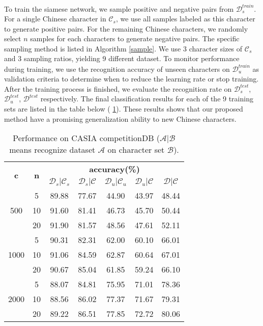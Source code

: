 \documentclass[conference]{IEEEtran}
\begin{document}
To train the siamese network, we sample positive and negative pairs from  $\mathcal{D}_s^{train}$. For a single Chinese character in $\mathcal{C}_s$, we use all samples labeled as this character to generate positive pairs. For the remaining Chinese characters, we randomly select $n$ samples for each characters to generate negative pairs. The specific sampling method is listed in Algorithm \ref{sample}. 
We use 3 character sizes of $\mathcal{C}_s$ and 3 sampling ratios, yielding 9 different dataset. To monitor performance during training, we use the recognition accuracy of unseen characters on $\mathcal{D}_u^{train}$ as validation criteria to determine when to reduce the learning rate or stop training. After the training process is finished, we evaluate the recognition rate on  $\mathcal{D}_s^{test}$, $\mathcal{D}_u^{test}$, $\mathcal{D}^{test}$ respectively.
The final classification results for each of the 9 training sets are listed in the table below (\tablename{ \ref{experiment}}). These results shows that our proposed method have a promising generalization ability to new Chinese characters.

\begin{table}[htb]
	\renewcommand{\arraystretch}{1.3}
	\caption{Performance on CASIA competitionDB
		($\mathcal{A}|\mathcal{B}$ means recognize dataset $\mathcal{A}$ on character set $\mathcal{B}$).}
	\label{experiment}
	\centering
	\begin{tabular}{|c|c|c|c|c|c|c|}
		\hline
		\multirow{2}{*}{\bfseries c} & \multirow{2}{*}{ \bfseries n} & \multicolumn{5}{c}{ \bfseries accuracy(\%)} \\
		\cline{3-7}
		\multirow{2}{*}{} & \multirow{2}{*}{} & $\mathcal{D}_s|\mathcal{C}_s $ & $\mathcal{D}_s|\mathcal{C}$ &  $\mathcal{D}_u|\mathcal{C}_u$ & $\mathcal{D}_u|\mathcal{C}$ & $\mathcal{D}|\mathcal{C}$ \\
		\hline
		\multirow{3}{*}{500} & 5 & 89.88 & 77.67 & 44.90 & 43.97 & 48.44 \\
		\cline{2-7}
		\multirow{3}{*}{} & 10 & 91.60 & 81.41 & 46.73 & 45.70 & 50.44\\
		\cline{2-7}
		\multirow{3}{*}{} & 20 & 91.90 & 81.57 & 48.56 & 47.61 & 52.11\\
		\hline
		\multirow{3}{*}{1000} & 5 & 90.31 & 82.31 & 62.00 & 60.10 & 66.01\\
		\cline{2-7}
		\multirow{3}{*}{} & 10 & 91.06 & 84.59 & 62.87 & 60.64 & 67.01\\
		\cline{2-7}
		\multirow{3}{*}{} & 20 & 90.67 & 85.04 & 61.85 & 59.24 & 66.10\\
		\hline
		\multirow{3}{*}{2000} & 5 & 88.07 & 84.81 & 75.95 & 71.01 & 78.36\\
		\cline{2-7}
		\multirow{3}{*}{} & 10 & 88.56 & 86.02 & 77.37 & 71.67 & 79.31\\
		\cline{2-7}
		\multirow{3}{*}{} & 20 & 89.22 & 86.51 & 77.85 & 72.72 & 80.06\\
		\hline
	\end{tabular}	
	
\end{table}
\end{document}
